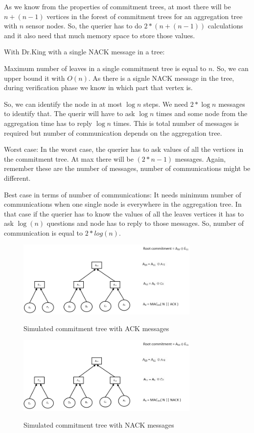 As we know from the properties of commitment trees, at most there 
will be $n + ( n - 1 )$ vertices in the forest of commitment trees 
for an aggregation tree with $n$ sensor nodes. So, the querier has
to do $ 2 * ( n + ( n - 1 ) )$ calculations and it also need that much memory space to store those values.

With Dr.King with a single NACK message in a tree:

Maximum number of leaves in a single commitment tree is equal to $n$. 
So, we can upper bound it with $O(n)$. As there is a signle NACK 
message in the tree, during verification phase we know in which part 
that vertex is. 

So, we can identify the node in at most $\log{n}$ steps.
We need $2*\log{n}$ messages to identify that. The querir will have to 
ask $\log{n}$ times and some node from the aggregation time has to 
reply $\log{n}$ times. This is total number of messages is required but 
number of communication depends on the aggregation tree.

Worst case:
In the worst case, the querier has to ask values of all the vertices in 
the commitment tree. At max there will be $(2*n - 1)$ messages. Again, 
remember these are the number of messages, number of communications 
might be different.

Best case in terms of number of communications:
It needs minimum number of communications when one single node is
everywhere in the aggregation tree. In that case if the querier has to 
know the values of all the leaves vertices it has to ask $\log(n)$ 
questions and node has to reply to those messages. So, number of 
communication is equal to $2 *log(n)$.



\begin{figure}[t]
	\centering
		\includegraphics[width=0.8\textwidth]{images/ack.png}\\
		\caption{Simulated commitment tree with ACK messages}
	\label{fig:figure1}
\end{figure}

\begin{figure}[t]
	\centering
		\includegraphics[width=0.8\textwidth]{images/nack.png}\\
		\caption[Simulated commitment tree with NACK messages]{Simulated commitment tree with NACK messages}
	\label{fig:figure1}
\end{figure}